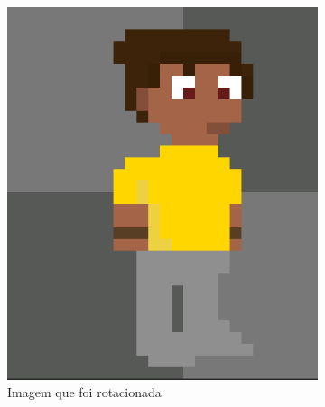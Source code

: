\begin{figure}[htbp]
    \centering
    \caption{\small Processo da utilização 8 da ferramenta de rotação do PixelLab em julho/2025}
    \label{fig:pixelLabRotacao9}

    \begin{subfigure}{0.35\linewidth}
        \includegraphics[width=1\linewidth]{figs/pixelLab/dia2/fix_teste_3.PNG}
        \caption{\small Imagem que foi rotacionada}
        \label{fig:pixelLabRot9a}
    \end{subfigure}
    \begin{subfigure}{0.35\linewidth}

\end{subfigure}
\end{figure}
